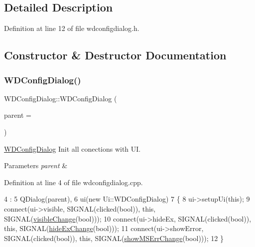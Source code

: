 \subsection{Detailed Description}


Definition at line 12 of file wdconfigdialog.\+h.



\subsection{Constructor \& Destructor Documentation}
\mbox{\label{class_w_d_config_dialog_adcd73104551e851520b62ae06734cb8e}} 
\subsubsection{\texorpdfstring{W\+D\+Config\+Dialog()}{WDConfigDialog()}}
{\footnotesize\ttfamily W\+D\+Config\+Dialog\+::\+W\+D\+Config\+Dialog (\begin{DoxyParamCaption}\item[{Q\+Widget $\ast$}]{parent = {} }\end{DoxyParamCaption})}



\hyperlink{class_w_d_config_dialog}{W\+D\+Config\+Dialog} Init all conections with UI. 


\begin{DoxyParams}{Parameters}
{\em parent} & \\
\hline
\end{DoxyParams}


Definition at line 4 of file wdconfigdialog.\+cpp.


\begin{DoxyCode}
4                                               :
5     QDialog(parent),
6     ui(\textcolor{keyword}{new} Ui::WDConfigDialog)
7 \{
8     ui->setupUi(\textcolor{keyword}{this});
9     connect(ui->visible, SIGNAL(clicked(\textcolor{keywordtype}{bool})), \textcolor{keyword}{this}, SIGNAL(\hyperlink{class_w_d_config_dialog_a46e6c2574fc6de02a4219c24867c4c41}{visibleChange}(\textcolor{keywordtype}{bool})));
10     connect(ui->hideEx, SIGNAL(clicked(\textcolor{keywordtype}{bool})), \textcolor{keyword}{this}, SIGNAL(\hyperlink{class_w_d_config_dialog_aa808e6dfb8b3489d9252f193f39ed22a}{hideExChange}(\textcolor{keywordtype}{bool})));
11     connect(ui->showError, SIGNAL(clicked(\textcolor{keywordtype}{bool})), \textcolor{keyword}{this}, SIGNAL(\hyperlink{class_w_d_config_dialog_a016142c07d15c313cbe71098e3c5b4df}{showMSErrChange}(\textcolor{keywordtype}{bool})));
12 \}
\end{DoxyCode}
\mbox{\label{class_w_d_config_dialog_a28db62577a732e8bc26038a37123ed60}} 
